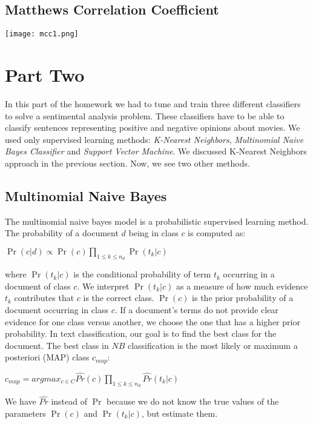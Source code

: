 \documentclass[11pt]{article}
\begin{document}
\subsection{Matthews Correlation Coefficient}
\texttt{[image: mcc1.png]}





\section{Part Two}
In this part of the homework we had to tune and train three different classifiers to solve a sentimental analysis problem. These classifiers have to be able to classify sentences representing positive and negative opinions about movies. We used only supervised learning methods: \textit{K-Nearest Neighbors}, \textit{Multinomial Naive Bayes Classifier} and \textit{Support Vector Machine}. We discussed K-Nearest Neighbors approach in the previous section. Now, we see two other methods. 

\subsection{Multinomial Naive Bayes}
The multinomial naive bayes model is a probabilistic supervised learning method. The probability of a document $d$ being in class $c$ is computed as: \\
\begin{center}
{$\Pr{(c|d)} \propto{\Pr{(c)} \prod_{1\leq{k}\leq{n_{d}}} \Pr{(t_{k} | c)}}$}
\end{center}
where $\Pr{(t_{k} | c)}$ is the conditional probability of term $t_{k}$ occurring in a document of class $c$. We interpret $\Pr{(t_{k} | c)}$ as a measure of how much evidence $t_{k}$ contributes that $c$ is the correct class. $\Pr{(c)}$ is the prior probability of a document occurring in class $c$. If a document's terms do not provide clear evidence for one class versus another, we choose the one that has a higher prior probability. In text classification, our goal is to find the best class for the document. The best class in $NB$ classification is the most likely or maximum a posteriori (MAP) class $c_{map}$: 
\begin{center}
$c_{map} = argmax_{c \in{C}} \hat{Pr} (c) \prod_{1\leq{k}\leq{n_{d}}} \hat{Pr} (t_{k} | c)$
\end{center}
We have $\hat{Pr}$ instead of $\Pr$ because we do not know the true values of the parameters $\Pr{(c)}$ and $\Pr{(t_{k} | c)}$, but estimate them. 
\end{document}
